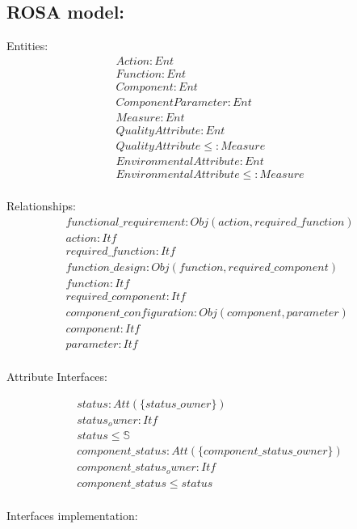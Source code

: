 \subsection{ROSA model:}

Entities:
\begin{gather}
    Action: Ent \\
    Function: Ent \\
    Component: Ent \\
    ComponentParameter: Ent \\
    Measure: Ent \\
    QualityAttribute: Ent \\
    QualityAttribute \leq : Measure \\
    EnvironmentalAttribute: Ent \\
    EnvironmentalAttribute \leq : Measure  \\
\end{gather}

Relationships:
\begin{gather}
    functional\_requirement : Obj({action, required\_function}) \\
    action : Itf \\
    required\_function : Itf \\
    function\_design : Obj({function, required\_component}) \\
    function : Itf \\
    required\_component : Itf \\
    component\_configuration : Obj({component, parameter}) \\
    component : Itf \\
    parameter : Itf \\
\end{gather}

Attribute Interfaces:

\begin{gather}
    status : Att(\{status\_owner\}) \\
    status_owner : Itf \\
    status \leq \mathbb{S} \\
    component\_status : Att(\{component\_status\_owner\}) \\
    component\_status_owner : Itf \\
    component\_status \leq status \\
\end{gather}

Interfaces implementation:

